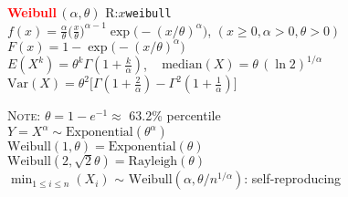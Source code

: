 \documentclass[10pt]{article}
\newenvironment{LIST}[1]{\begin{list}{}
                          { \settowidth{\labelwidth}{#1}
                            \setlength{\leftmargin}{\labelwidth}
                            \addtolength{\leftmargin}{\labelsep}
                            \setlength{\parsep}{0.5ex plus0.2ex minus0.2ex}
                            \setlength{\itemsep}{0ex plus0.2ex}
                            \renewcommand{\makelabel}[1]{##1\hfill}
                          }
                        }
                        {\end{list}}
\begin{document}
\begin{multicols}{2}
\begin{small}
\begin{enumerate}
\item \textcolor{red}{\bfseries\textsf{Weibull}}\,$(\alpha,\theta)$ \hfill \textsf{R:}$x$\texttt{\color{red}weibull}  \\
      $f(x)=\displaystyle\frac{\alpha}{\theta} \Big(\frac{x}{\theta}\Big)^{\alpha-1} 
                \exp\big(-({x}/{\theta})^{\alpha} \big)$,
            $(x\ge0, \alpha>0, \theta>0)$  \\
      $F(x)=1-\exp\big( -({x}/{\theta})^{\alpha} \big)$\\
      $E(X^k) = \theta^k \Gamma(1+\frac{k}{\alpha})$,  ~
         $\mathrm{median}(X) =  \theta\,(\ln2)^{1/\alpha}$ \\
      $\textrm{Var}(X)= \theta^2
            \Big[\Gamma(1+\frac{2}{\alpha})-\Gamma^2(1+\frac{1}{\alpha})\Big]$
      \begin{LIST}{\textsc{Note:}}
      \item[\textsc{Note:}] 
           $\theta = 1-e^{-1} \approx$  63.2\% percentile \\
           $Y = X^{\alpha} \sim \textrm{Exponential}(\theta^{\alpha})$\\
           $\textrm{Weibull}(1,\theta)=\textrm{Exponential}(\theta)$  \\
           $\textrm{Weibull}(2, \sqrt{2}\theta)=\textrm{Rayleigh}(\theta)$  \\
           $\displaystyle\min_{1\le i\le n}(X_i)$ $\sim$
                   $\textrm{Weibull}(\alpha,\theta/{n}^{1/\alpha})$: self-reproducing 
      \end{LIST}

\end{enumerate} 
\end{small}
\end{multicols}




\end{document}
